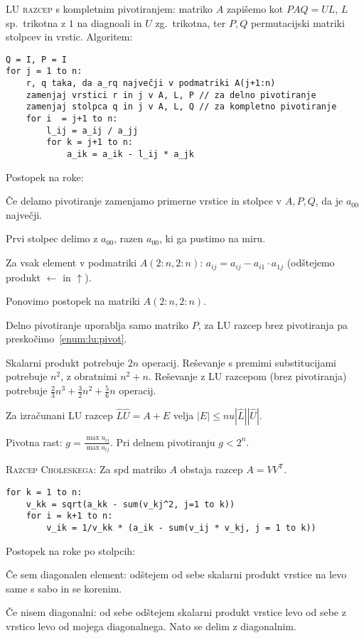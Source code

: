 \documentclass[a4paper,10pt]{article}
\theoremstyle{definition}
\newenvironment{enumerate*}%
{
\vspace{-6pt}
\begin{enumerate}
\setlength{\itemsep}{0pt}
\setlength{\parskip}{2pt}
}
{\end{enumerate}}
\newcommand{\T}{\mathsf{T}\!}
\begin{document}
\textsc{LU razcep} s kompletnim pivotiranjem: matriko $A$ zapišemo kot $PAQ =
UL$, $L$ sp.\ trikotna z $1$ na diagnoali in $U$ zg.\ trikotna, ter $P, Q$
permutacijski matriki stolpcev in vrstic. Algoritem:
\scriptsize
\begin{verbatim}
Q = I, P = I
for j = 1 to n:
    r, q taka, da a_rq največji v podmatriki A(j+1:n)
    zamenjaj vrstici r in j v A, L, P // za delno pivotiranje
    zamenjaj stolpca q in j v A, L, Q // za kompletno pivotiranje
    for i  = j+1 to n:
        l_ij = a_ij / a_jj
        for k = j+1 to n:
            a_ik = a_ik - l_ij * a_jk
\end{verbatim}
\normalsize

Postopek na roke:
\begin{enumerate*}
  \item * Če delamo pivotiranje zamenjamo primerne vrstice in stolpce v
    $A, P, Q$, da je $a_{00}$ največji. \label{enum:lu:pivot}
  \item Prvi stolpec delimo z $a_{00}$, razen $a_{00}$, ki ga pustimo na miru.
  \item Za vsak element v podmatriki $A(2:n, 2:n)$: $a_{ij} = a_{ij} - a_{i1} \cdot
    a_{1j}$ (odštejemo produkt  $\leftarrow$ in $\uparrow$).
  \item Ponovimo postopek na matriki $A(2:n, 2:n)$.
\end{enumerate*}

Delno pivotiranje uporablja samo matriko $P$, za LU razcep brez pivotiranja pa
preskočimo~\ref{enum:lu:pivot}.

Skalarni produkt potrebuje $2n$ operacij. Reševanje s premimi substitucijami
potrebuje $n^2$, z obratnimi $n^2+n$. Reševanje z LU razcepom (brez pivotiranja) potrebuje
$\frac23n^3 + \frac32n^2 + \frac56n$ operacij.

Za izračunani LU razcep $\hat{L}\hat{U} = A + E$ velja $|E| \leq
nu|\hat{L}||\hat{U}|$.

Pivotna rast: $g = \frac{\max u_{ij}}{\max a_{ij}}$. Pri delnem pivotiranju $g < 2^n$.

\textsc{Razcep Choleskega:}
Za spd matriko $A$ obstaja razcep $A = VV^\T$.
\scriptsize
\begin{verbatim}
for k = 1 to n:
    v_kk = sqrt(a_kk - sum(v_kj^2, j=1 to k))
    for i = k+1 to n:
        v_ik = 1/v_kk * (a_ik - sum(v_ij * v_kj, j = 1 to k))
\end{verbatim}
\normalsize
Postopek na roke po stolpcih:
\begin{enumerate*}
  \item Če sem diagonalen element: odštejem od sebe skalarni produkt vrstice na
    levo same s sabo in se korenim.
  \item Če nisem diagonalni: od sebe odštejem skalarni produkt vrstice levo od
    sebe z vrstico levo od mojega diagonalnega. Nato se delim z
    diagonalnim.
\end{enumerate*}
\end{document}
